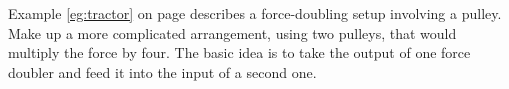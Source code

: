  Example \ref{eg:tractor} on page \pageref{eg:tractor} describes a force-doubling
setup involving a pulley. Make up a more complicated
arrangement, using two pulleys, that would multiply
the force by four. The basic idea is to take the output
of one force doubler and feed it into the input of a second one.
